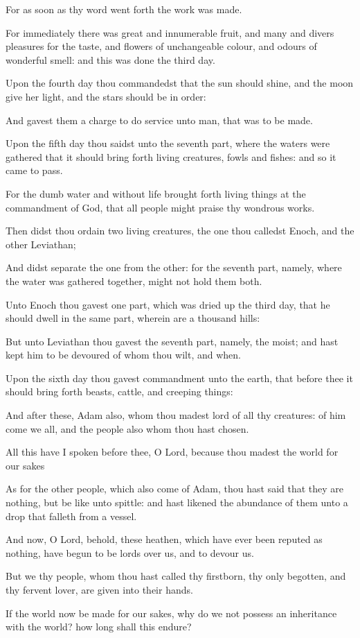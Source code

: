 {\par }{\PP {}For as soon as thy word went forth the work was made.
\par }{\PP {}For immediately there was great and innumerable fruit, and many and divers pleasures for the taste, and flowers of unchangeable colour, and odours of wonderful smell: and this was done the third day.
\par }{\PP {}Upon the fourth day thou commandedst that the sun should shine, and the moon give her light, and the stars should be in order:
\par }{\PP {}And gavest them a charge to do service unto man, that was to be made.
\par }{\PP {}Upon the fifth day thou saidst unto the seventh part, where the waters were gathered that it should bring forth living creatures, fowls and fishes: and so it came to pass.
\par }{\PP {}For the dumb water and without life brought forth living things at the commandment of God, that all people might praise thy wondrous works.
\par }{\PP {}Then didst thou ordain two living creatures, the one thou calledst Enoch, and the other Leviathan;
\par }{\PP {}And didst separate the one from the other: for the seventh part, namely, where the water was gathered together, might not hold them both.
\par }{\PP {}Unto Enoch thou gavest one part, which was dried up the third day, that he should dwell in the same part, wherein are a thousand hills:
\par }{\PP {}But unto Leviathan thou gavest the seventh part, namely, the moist; and hast kept him to be devoured of whom thou wilt, and when.
\par }{\PP {}Upon the sixth day thou gavest commandment unto the earth, that before thee it should bring forth beasts, cattle, and creeping things:
\par }{\PP {}And after these, Adam also, whom thou madest lord of all thy creatures: of him come we all, and the people also whom thou hast chosen.
\par }{\PP {}All this have I spoken before thee, O Lord, because thou madest the world for our sakes
\par }{\PP {}As for the other people, which also come of Adam, thou hast said that they are nothing, but be like unto spittle: and hast likened the abundance of them unto a drop that falleth from a vessel.
\par }{\PP {}And now, O Lord, behold, these heathen, which have ever been reputed as nothing, have begun to be lords over us, and to devour us.
\par }{\PP {}But we thy people, whom thou hast called thy firstborn, thy only begotten, and thy fervent lover, are given into their hands.
\par }{\PP {}If the world now be made for our sakes, why do we not possess an inheritance with the world? how long shall this endure?

}
